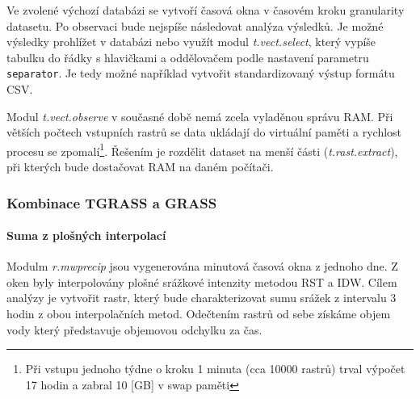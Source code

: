 \documentclass[a4paper,12pt,oneside]{report}
\begin{document}
Ve zvolené výchozí databázi se vytvoří časová okna v časovém kroku granularity datasetu.
Po observaci bude nejspíše následovat analýza výsledků. Je možné výsledky prohlížet v databázi nebo využít modul \textit{t.vect.select}, který vypíše tabulku do řádky s hlavičkami a oddělovačem podle nastavení parametru \texttt{separator}. Je tedy možné například vytvořit standardizovaný výstup formátu CSV.

Modul \textit{t.vect.observe} v současné době nemá zcela vyladěnou správu \acs{RAM}. Při větších počtech vstupních rastrů se data ukládají do virtuální paměti a rychlost procesu se zpomalí\footnote{Při vstupu jednoho týdne o kroku 1 minuta (cca 10000 rastrů) trval výpočet 17 hodin a zabral 10 [GB] v swap paměti }. Řešením je rozdělit dataset na menší části (\textit{t.rast.extract}), při kterých bude dostačovat \acs{RAM} na daném počítači.


\subsubsection*{Kombinace TGRASS a GRASS}

\paragraph*{Suma z plošných interpolací}
Modulm \emph{r.mwprecip} jsou vygenerována minutová časová okna z jednoho dne. Z oken byly interpolovány plošné srážkové intenzity metodou RST a IDW. Cílem analýzy je vytvořit rastr, který bude charakterizovat sumu srážek z intervalu 3 hodin z obou interpolačních metod. Odečtením rastrů od sebe získáme objem vody který představuje objemovou odchylku za čas.
\end{document}
